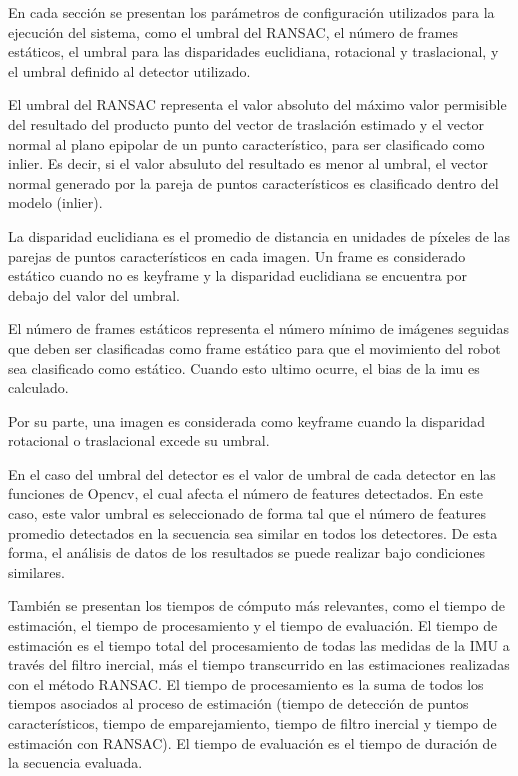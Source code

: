 
En cada sección se presentan los parámetros de configuración utilizados para la ejecución del sistema, como el umbral del RANSAC, el número de frames estáticos, el umbral para las disparidades euclidiana, rotacional y traslacional, y el umbral definido al detector utilizado. 
 
 El umbral del RANSAC representa el valor absoluto del máximo valor permisible del resultado del producto punto del vector de traslación estimado y el vector normal al plano epipolar de un punto característico, para ser clasificado como inlier. Es decir, si el valor absuluto del resultado es menor al umbral, el vector normal generado por la pareja de puntos característicos es clasificado dentro del modelo (inlier).
 
 La disparidad euclidiana es el promedio de distancia en unidades de píxeles de las parejas de puntos característicos en cada imagen. Un frame es considerado estático cuando no es keyframe y la disparidad euclidiana se encuentra por debajo del valor del umbral.
 
 El número de frames estáticos representa el número mínimo de imágenes seguidas que deben ser clasificadas como frame estático para que el movimiento del robot sea clasificado como estático. Cuando esto ultimo ocurre, el bias de la imu es calculado.

 Por su parte, una imagen es considerada como keyframe cuando la disparidad rotacional o traslacional excede su umbral.
 
 En el caso del umbral del detector es el valor de umbral de cada detector en las funciones de Opencv, el cual afecta el número de features detectados. En este caso, este valor umbral es seleccionado de forma tal que el número de features promedio detectados en la secuencia sea similar en todos los detectores. De esta forma, el análisis de datos de los resultados se puede realizar bajo condiciones similares.
 
 
 También se presentan los tiempos de cómputo más relevantes, como el tiempo de estimación, el tiempo de procesamiento y el tiempo de evaluación. El tiempo de estimación es el tiempo total del procesamiento de todas las medidas de la IMU a través del filtro inercial, más el tiempo transcurrido en las estimaciones realizadas con el método RANSAC. El tiempo de procesamiento es la suma de todos los tiempos asociados al proceso de estimación (tiempo de detección de puntos característicos, tiempo de emparejamiento, tiempo de filtro inercial y tiempo de estimación con RANSAC). El tiempo de evaluación es el tiempo de duración de la secuencia evaluada.
 
